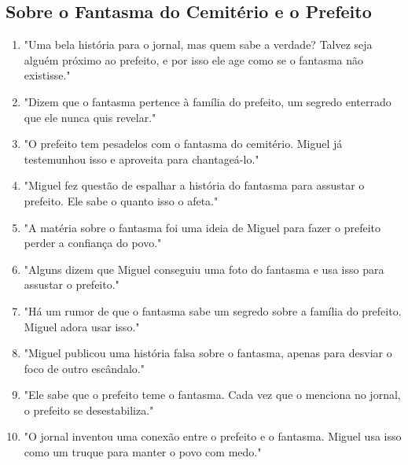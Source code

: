 \subsection*{Sobre o Fantasma do Cemitério e o Prefeito}
\begin{enumerate}
    \item "Uma bela história para o jornal, mas quem sabe a verdade? Talvez seja alguém próximo ao prefeito, e por isso ele age como se o fantasma não existisse."
    \item "Dizem que o fantasma pertence à família do prefeito, um segredo enterrado que ele nunca quis revelar."
    \item "O prefeito tem pesadelos com o fantasma do cemitério. Miguel já testemunhou isso e aproveita para chantageá-lo."
    \item "Miguel fez questão de espalhar a história do fantasma para assustar o prefeito. Ele sabe o quanto isso o afeta."
    \item "A matéria sobre o fantasma foi uma ideia de Miguel para fazer o prefeito perder a confiança do povo."
    \item "Alguns dizem que Miguel conseguiu uma foto do fantasma e usa isso para assustar o prefeito."
    \item "Há um rumor de que o fantasma sabe um segredo sobre a família do prefeito. Miguel adora usar isso."
    \item "Miguel publicou uma história falsa sobre o fantasma, apenas para desviar o foco de outro escândalo."
    \item "Ele sabe que o prefeito teme o fantasma. Cada vez que o menciona no jornal, o prefeito se desestabiliza."
    \item "O jornal inventou uma conexão entre o prefeito e o fantasma. Miguel usa isso como um truque para manter o povo com medo."
\end{enumerate}

